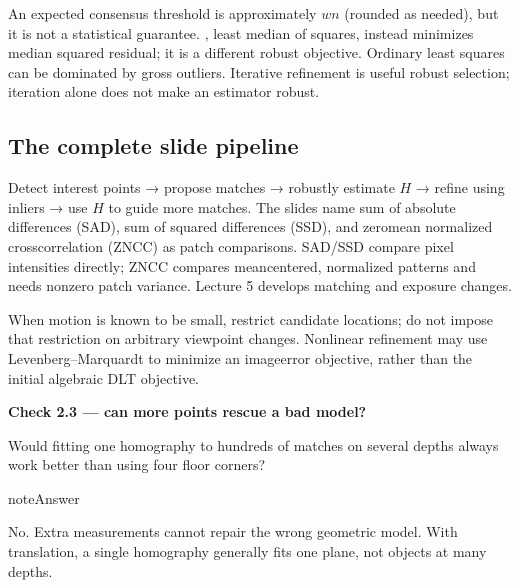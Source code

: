 \documentclass[letterpaper,11pt,english,openany,oneside]{jupyterBook}
\begin{document}
\sphinxAtStartPar
An expected consensus threshold is approximately \(wn\) (rounded as needed), but it is not a statistical guarantee. , least median of squares, instead minimizes median squared residual; it is a different robust objective. Ordinary least squares can be dominated by gross outliers. Iterative refinement is useful  robust selection; iteration alone does not make an estimator robust.


\subsection{The complete slide pipeline}
\label{\detokenize{lectures/lecture02/estimation:the-complete-slide-pipeline}}
\sphinxAtStartPar
Detect interest points → propose matches → robustly estimate \(H\) → refine using inliers → use \(H\) to guide more matches. The slides name sum of absolute differences (SAD), sum of squared differences (SSD), and zero\sphinxhyphen{}mean normalized cross\sphinxhyphen{}correlation (ZNCC) as patch comparisons. SAD/SSD compare pixel intensities directly; ZNCC compares mean\sphinxhyphen{}centered, normalized patterns and needs nonzero patch variance. Lecture 5 develops matching and exposure changes.

\sphinxAtStartPar
When motion is known to be small, restrict candidate locations; do not impose that restriction on arbitrary viewpoint changes. Nonlinear refinement may use Levenberg–Marquardt to minimize an image\sphinxhyphen{}error objective, rather than the initial algebraic DLT objective.

\begin{TextbookBox}
\textbf{Check 2.3 — can more points rescue a bad model?}\par\smallskip

\sphinxAtStartPar
Would fitting one homography to hundreds of matches on several depths always work better than using four floor corners?

\end{TextbookBox}

\begin{sphinxadmonition}{note}{Answer}

\sphinxAtStartPar
No. Extra measurements cannot repair the wrong geometric model. With translation, a single homography generally fits one plane, not objects at many depths.
\end{sphinxadmonition}

\ignorespaces
{}\ignorespaces
{}\ignorespaces
{}\ignorespaces
\sphinxstepscope
\end{document}
